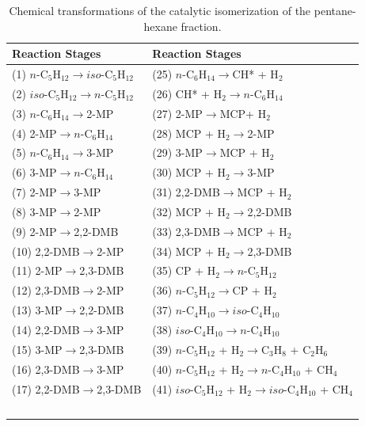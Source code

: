 \documentclass[mathematics,article,accept,pdftex,moreauthors]{Definitions/mdpi}
\begin{document}
	
	\begin{table}[H] 
		\caption{Chemical transformations of the catalytic isomerization of the pentane-hexane fraction.\label{tab_chemistry}}
		\begin{tabularx}{\textwidth}{CC}
			\toprule
			\textbf{Reaction Stages} & \textbf{Reaction Stages} \\
			\midrule
			(1) $n$-C$_5$H$_{12}$$\rightarrow$$iso$-C$_5$H$_{12}$ & (25) $n$-C$_6$H$_{14}$$\rightarrow$CH* + H$_2$\\
			(2) $iso$-C$_5$H$_{12}$$\rightarrow$$n$-C$_5$H$_{12}$ & (26) CH* + H$_2$$\rightarrow$$n$-C$_6$H$_{14}$ \\
			(3) $n$-C$_6$H$_{14}$$\rightarrow$2-MP & (27) 2-MP$\rightarrow$MCP+ H$_2$ \\
			(4) 2-MP$\rightarrow$$n$-C$_6$H$_{14}$ & (28) MCP + H$_2$$\rightarrow$2-MP  \\
			(5) $n$-C$_6$H$_{14}$$\rightarrow$3-MP & (29) 3-MP$\rightarrow$MCP + H$_2$ \\
			(6) 3-MP$\rightarrow$$n$-C$_6$H$_{14}$  & (30) MCP + H$_2$$\rightarrow$3-MP \\
			(7)  2-MP$\rightarrow$3-MP & (31) 2,2-DMB$\rightarrow$MCP + H$_2$ \\
			(8) 3-MP$\rightarrow$2-MP  & (32) MCP + H$_2$$\rightarrow$2,2-DMB \\
			(9) 2-MP$\rightarrow$2,2-DMB  & (33) 2,3-DMB$\rightarrow$MCP + H$_2$ \\
			(10) 2,2-DMB$\rightarrow$2-MP  & (34) MCP + H$_2$$\rightarrow$2,3-DMB \\
			(11) 2-MP$\rightarrow$2,3-DMB  & (35) CP + H$_2$$\rightarrow$$n$-C$_5$H$_{12}$ \\
			(12) 2,3-DMB$\rightarrow$2-MP  & (36) $n$-C$_5$H$_{12}$$\rightarrow$CP + H$_2$ \\
			(13) 3-MP$\rightarrow$2,2-DMB  & (37) $n$-C$_4$H$_{10}$$\rightarrow$$iso$-C$_4$H$_{10}$ \\
			(14) 2,2-DMB$\rightarrow$3-MP  & (38) $iso$-C$_4$H$_{10}$$\rightarrow$$n$-C$_4$H$_{10}$ \\
			(15) 3-MP$\rightarrow$2,3-DMB  & (39) $n$-C$_5$H$_{12}$ + H$_2$$\rightarrow$C$_3$H$_8$ + C$_2$H$_6$ \\
			(16) 2,3-DMB$\rightarrow$3-MP  & (40) $n$-C$_5$H$_{12}$ + H$_2$$\rightarrow$$n$-C$_4$H$_{10}$ + CH$_4$ \\
			(17) 2,2-DMB$\rightarrow$2,3-DMB  & (41) $iso$-C$_5$H$_{12}$ + H$_2$$\rightarrow$$iso$-C$_4$H$_{10}$ + CH$_4$ \\
$$
\end{tabularx}
\end{table}
\end{document}
